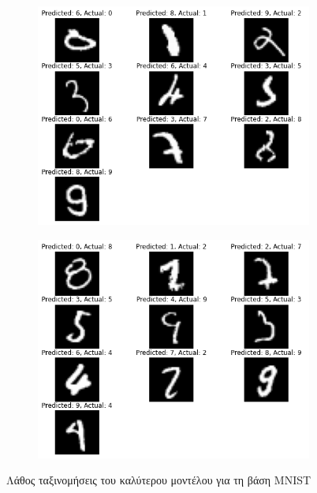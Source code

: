 \documentclass[a4paper]{article}
\begin{document}
\begin{figure}[H]
    \centering

    \begin{subfigure}[t]{0.48\linewidth}
    \includegraphics[width=\linewidth]{figures/mnist/wrong_results_1.png}
    \end{subfigure}
    \begin{subfigure}[t]{0.48\linewidth}
    \includegraphics[width=\linewidth]{figures/mnist/wrong_results_2.png}
    \end{subfigure}

    \caption{Λάθος ταξινομήσεις του καλύτερου μοντέλου για τη βάση MNIST}
    \label{fig:mnist_wrong}
\end{figure}
\end{document}
